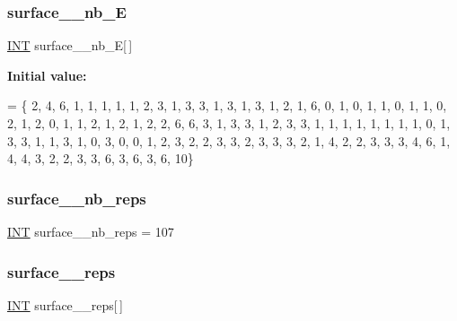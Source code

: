 \mbox{\label{surface__41_8_c_ac1282a5a5512d1cb41af5b8118ec3f75}} 
\subsubsection{\texorpdfstring{surface\+\_\+\_\+nb\+\_\+E}{surface\_41\_nb\_E}}
{\footnotesize\ttfamily \mbox{\hyperlink{galois_8h_a09fddde158a3a20bd2dcadb609de11dc}{I\+NT}} surface\+\_\+\_\+nb\+\_\+E\mbox{[}$\,$\mbox{]}}

{\bfseries Initial value\+:}
\begin{DoxyCode}
= \{ 
    2, 4, 6, 1, 1, 1, 1, 1, 2, 3, 
    1, 3, 3, 1, 3, 1, 3, 1, 2, 1, 
    6, 0, 1, 0, 1, 1, 0, 1, 1, 0, 
    2, 1, 2, 0, 1, 1, 2, 1, 2, 1, 
    2, 2, 6, 6, 3, 1, 3, 3, 1, 2, 
    3, 3, 1, 1, 1, 1, 1, 1, 1, 1, 
    0, 1, 3, 3, 1, 1, 3, 1, 0, 3, 
    0, 0, 1, 2, 3, 2, 2, 3, 3, 2, 
    3, 3, 3, 2, 1, 4, 2, 2, 3, 3, 
    3, 4, 6, 1, 4, 4, 3, 2, 2, 3, 
    3, 6, 3, 6, 3, 6, 10\}
\end{DoxyCode}
\mbox{\label{surface__41_8_c_afb3c710b0a38cd5d7a817c53cffb5504}} 
\subsubsection{\texorpdfstring{surface\+\_\+\_\+nb\+\_\+reps}{surface\_41\_nb\_reps}}
{\footnotesize\ttfamily \mbox{\hyperlink{galois_8h_a09fddde158a3a20bd2dcadb609de11dc}{I\+NT}} surface\+\_\+\_\+nb\+\_\+reps = 107}

\mbox{\label{surface__41_8_c_a7be9eb6a20b2fcd1669a22e37e74dc1b}} 
\subsubsection{\texorpdfstring{surface\+\_\+\_\+reps}{surface\_41\_reps}}
{\footnotesize\ttfamily \mbox{\hyperlink{galois_8h_a09fddde158a3a20bd2dcadb609de11dc}{I\+NT}} surface\+\_\+\_\+reps\mbox{[}$\,$\mbox{]}}

